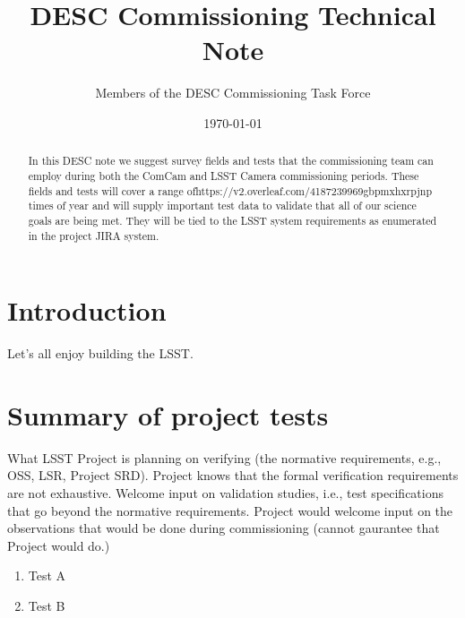 \documentclass[modern]{desc-tex/styles/lsstdescnote}
\begin{document}
\title{DESC Commissioning Technical Note}
\author{Members of the DESC Commissioning Task Force}
\date{\today}


\begin{abstract}
  In this DESC note we suggest survey fields and tests that the
  commissioning team can employ during both the ComCam and LSST Camera
  commissioning periods.  These fields and tests will cover a range ofhttps://v2.overleaf.com/4187239969gbpmxhxrpjnp
  times of year and will supply important test data to validate that
  all of our science goals are being met.  They will be tied to the
  LSST system requirements as enumerated in the project JIRA system.
\end{abstract}

\maketitle

\noindent
\begin{center}
  \fboxsep=5pt  
 \end{center} 
\vspace{0.1in}

\section{Introduction}

Let's all enjoy building the LSST.

\section{Summary of project tests}

What LSST Project is planning on verifying (the normative requirements, e.g., OSS, LSR, Project SRD).
Project knows that the formal verification requirements are not exhaustive.
Welcome input on validation studies, i.e., test specifications that go beyond the normative requirements.
Project would welcome input on the observations that would be done during commissioning (cannot gaurantee that Project would do.)

\begin{enumerate}
\item Test A
\item Test B
\end{enumerate}
\end{document}
